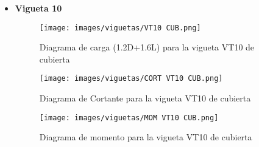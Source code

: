\begin{itemize}
             \item \textbf{Vigueta 10}\\
        \begin{figure}[H]
                \centering
                \texttt{[image: images/viguetas/VT10 CUB.png]} 
                \caption{Diagrama de carga (1.2D+1.6L) para la vigueta VT10 de cubierta}
                \label{fig:W VT10 CUB}
            \end{figure}
            
            \begin{figure}[H]
                \centering
                \texttt{[image: images/viguetas/CORT VT10 CUB.png]}
                \caption{Diagrama de Cortante para la vigueta VT10 de cubierta}
                \label{fig:v VT10 CUB}
            \end{figure}
            
             \begin{figure}[H]
                \centering
                \texttt{[image: images/viguetas/MOM VT10 CUB.png]} 
                \caption{Diagrama de momento para la vigueta VT10 de cubierta}
                \label{fig:M VT10 CUB}
            \end{figure}
    
\end{itemize}